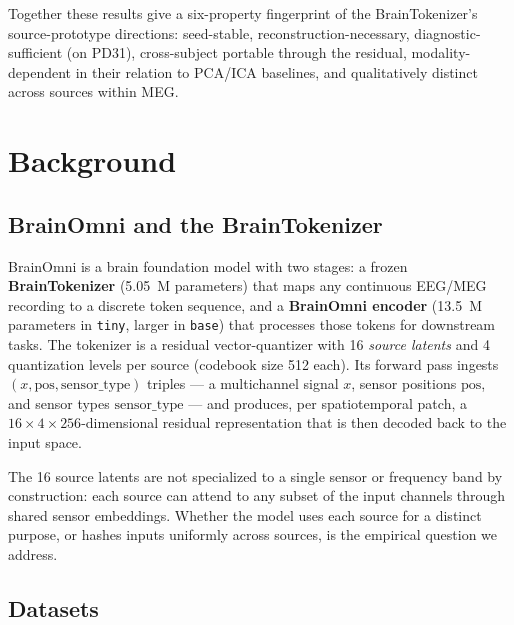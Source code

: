 \documentclass[11pt]{article}
\begin{document}
Together these results give a six-property fingerprint of the BrainTokenizer's
source-prototype directions: seed-stable, reconstruction-necessary,
diagnostic-sufficient (on PD31), cross-subject portable through the residual,
modality-dependent in their relation to PCA/ICA baselines, and qualitatively
distinct across sources within MEG.

\section{Background}\label{sec:background}

\subsection{BrainOmni and the BrainTokenizer}

BrainOmni is a brain foundation model with two stages: a frozen
\textbf{BrainTokenizer} (5.05~M parameters) that maps any continuous EEG/MEG
recording to a discrete token sequence, and a \textbf{BrainOmni encoder}
(13.5~M parameters in \texttt{tiny}, larger in \texttt{base}) that processes
those tokens for downstream tasks. The tokenizer is a residual vector-quantizer
with 16 \emph{source latents} and 4 quantization levels per source (codebook
size 512 each). Its forward pass ingests $(x, \mathrm{pos},
\mathrm{sensor\_type})$ triples --- a multichannel signal $x$, sensor positions
$\mathrm{pos}$, and sensor types $\mathrm{sensor\_type}$ --- and produces, per
spatiotemporal patch, a $16\!\times\!4\!\times\!256$-dimensional residual
representation that is then decoded back to the input space.

The 16 source latents are not specialized to a single sensor or frequency band
by construction: each source can attend to any subset of the input channels
through shared sensor embeddings. Whether the model uses each source for a
distinct purpose, or hashes inputs uniformly across sources, is the empirical
question we address.

\subsection{Datasets}
\end{document}
